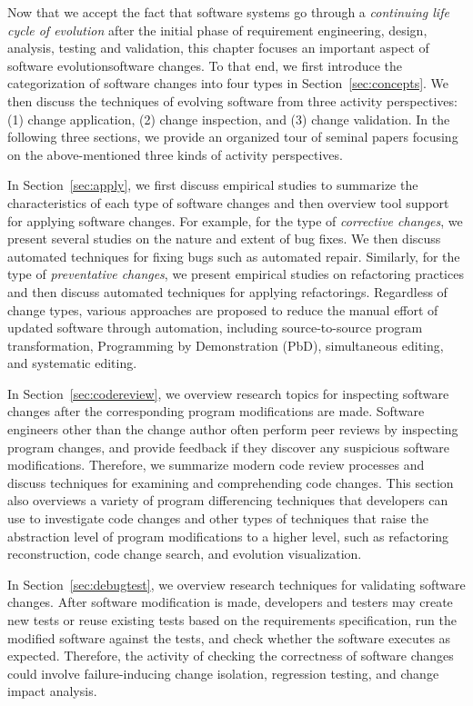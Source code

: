 Now that we accept the fact that software systems go through a {\em continuing life cycle of evolution} after the initial phase of requirement engineering, design, analysis, testing and validation, this chapter focuses an important aspect of software evolution\textemdash software changes. To that end, we first introduce the categorization of software changes into four types in Section~\ref{sec:concepts}. We then discuss the techniques of evolving software from three activity perspectives: (1) change application, (2) change inspection, and (3) change validation. In the following three sections, we provide an organized tour of seminal papers focusing on the above-mentioned three kinds of activity perspectives. 

In Section~\ref{sec:apply}, we first discuss empirical studies to summarize the characteristics of each type of software changes and then overview tool support for applying software changes. For example, for the type of {\em corrective changes}, we present several studies on the nature and extent of bug fixes. We then discuss automated techniques for fixing bugs such as automated repair. Similarly, for the type of {\em preventative changes}, we present empirical studies on refactoring practices and then discuss automated techniques for applying refactorings.  Regardless of change types, various approaches are proposed to reduce the manual effort of updated software through automation, including source-to-source program transformation, Programming by Demonstration (PbD), simultaneous editing, and systematic editing.

In Section~\ref{sec:codereview}, we overview research topics for inspecting software changes after the corresponding program modifications are made. Software engineers other than the change author often perform peer reviews by inspecting program changes, and provide feedback if they discover any suspicious software modifications. Therefore, we summarize modern code review processes and discuss techniques for examining and comprehending code changes. This section also overviews a variety of program differencing techniques that developers can use to investigate code changes and other types of techniques that raise the abstraction level of program modifications to a higher level, such as refactoring reconstruction, code change search, and evolution visualization. 

In Section~\ref{sec:debugtest}, we overview research techniques for validating software changes. 
After software modification is made, developers and testers may create new tests or reuse existing tests based on the requirements specification, run the modified software against the tests, and check whether the software executes as expected. Therefore, the activity of checking the correctness of software changes could involve failure-inducing change isolation, regression testing, and change impact analysis. 

